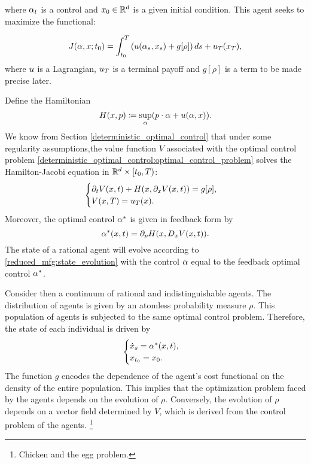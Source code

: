 \documentclass{article}
\begin{document}
where $\alpha_t$ is a control and $x_0\in\mathbb{R}^d$ is a given initial condition. This agent seeks to maximize the functional:

\begin{equation}\label{reduced_mfg:payoff_functional}
    J({ \alpha},x; t_0) = \int_{t_0}^T \left(u({\alpha}_s,{x}_s) + g[\rho] \right) ds + u_T({ x}_T),
\end{equation}
where $u$ is a Lagrangian, $u_T$ is a terminal payoff and $g[\rho]$ is a term to be made precise later. 

Define the Hamiltonian
\begin{equation}\label{reduced_mfg:hamiltonian}
        H(x,p) \coloneqq \sup_{\alpha} ( p \cdot \alpha + u(\alpha,x)).
\end{equation}
We know from Section
\eqref{deterministic_optimal_control}
that under some regularity assumptions,the value function $V$ associated with
the optimal control problem
\eqref{deterministic_optimal_control:optimal_control_problem} 
solves the Hamilton-Jacobi equation in $\mathbb{R}^d \times [t_0,T)$:
\begin{equation}\label{reduced_mfg:state_evolution_hamiltonian}
\begin{cases}
    \partial_t V (x,t) + H(x,\partial_x V(x,t)) = g[\rho], \\
    V(x,T) = u_T(x).
\end{cases}
\end{equation}
Moreover, the optimal control $\alpha^*$ is given in feedback form by
$$\alpha^*(x,t) = \partial_p H(x, D_x V(x, t)).$$
The state of a rational agent will evolve according to 
\eqref{reduced_mfg:state_evolution} with the control $\alpha$ equal to the feedback optimal control $\alpha^*$.

Consider then a continuum of rational and indistinguishable agents.
The distribution of agents is given by an atomless probability measure $\rho$.
This population of agents is subjected to the same optimal control problem.
Therefore, the state of each individual is driven by
\begin{equation}\label{reduced_mfg:feedback_state_evolution}
\begin{cases}
        {\dot {x}}_s = \alpha^*(x,t),\\
        {x}_{t_0} = x_0.
\end{cases}
\end{equation}
The function $g$ encodes the dependence of the agent's cost functional on the density of the entire population.
This implies that the optimization problem faced by the agents depends on the evolution of $\rho$.
Conversely, the evolution of $\rho$ depends on a vector field determined by $V$, which is derived from the control problem of the agents.
\footnote{Chicken and the egg problem.}
\end{document}
